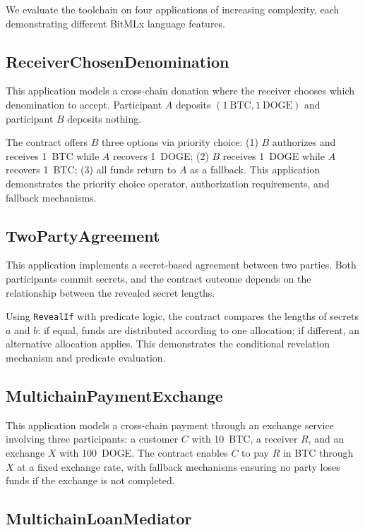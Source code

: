 \documentclass[journal]{IEEEtran}
\begin{document}
We evaluate the toolchain on four applications of increasing complexity, each demonstrating different BitMLx language features.

\subsection{ReceiverChosenDenomination}

This application models a cross-chain donation where the receiver chooses which denomination to accept. Participant $A$ deposits $(1~\text{BTC}, 1~\text{DOGE})$ and participant $B$ deposits nothing.

The contract offers $B$ three options via priority choice: (1) $B$ authorizes and receives 1~BTC while $A$ recovers 1~DOGE; (2) $B$ receives 1~DOGE while $A$ recovers 1~BTC; (3) all funds return to $A$ as a fallback. This application demonstrates the priority choice operator, authorization requirements, and fallback mechanisms.

\subsection{TwoPartyAgreement}

This application implements a secret-based agreement between two parties. Both participants commit secrets, and the contract outcome depends on the relationship between the revealed secret lengths.

Using \texttt{RevealIf} with predicate logic, the contract compares the lengths of secrets $a$ and $b$: if equal, funds are distributed according to one allocation; if different, an alternative allocation applies. This demonstrates the conditional revelation mechanism and predicate evaluation.

\subsection{MultichainPaymentExchange}

This application models a cross-chain payment through an exchange service involving three participants: a customer $C$ with 10~BTC, a receiver $R$, and an exchange $X$ with 100~DOGE. The contract enables $C$ to pay $R$ in BTC through $X$ at a fixed exchange rate, with fallback mechanisms ensuring no party loses funds if the exchange is not completed.

\subsection{MultichainLoanMediator}
\end{document}
